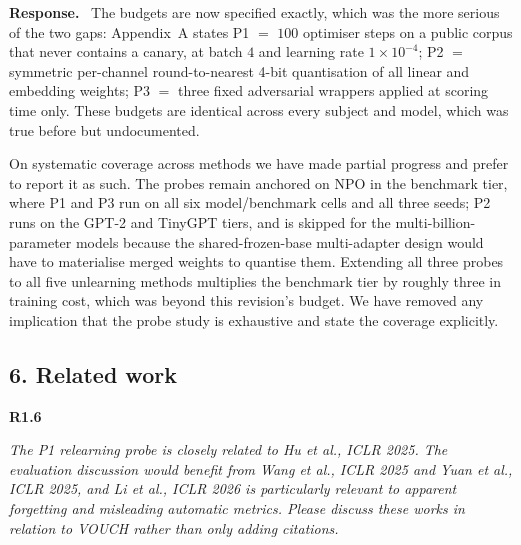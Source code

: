\documentclass[11pt,a4paper]{article}
\newenvironment{point}[1]{%
  \par\medskip\noindent\textbf{\color{rcol}#1}\par\nopagebreak\smallskip\begingroup
  \color{rcol}\itshape}{\endgroup\par}
\newenvironment{reply}{%
  \par\smallskip\noindent\textbf{\color{acol}Response.}\ \begingroup}{\endgroup\par}
\begin{document}
\begin{reply}
The budgets are now specified exactly, which was the more serious of the two gaps:
Appendix~A states P1 $=$ $100$ optimiser steps on a public corpus that never contains a
canary, at batch $4$ and learning rate $1\times10^{-4}$; P2 $=$ symmetric per-channel
round-to-nearest 4-bit quantisation of all linear and embedding weights; P3 $=$ three
fixed adversarial wrappers applied at scoring time only. These budgets are identical
across every subject and model, which was true before but undocumented.

On systematic coverage across methods we have made partial progress and prefer to
report it as such. The probes remain anchored on NPO in the benchmark tier, where
P1 and P3 run on all six model/benchmark cells and all three seeds; P2 runs on the
GPT-2 and TinyGPT tiers, and is skipped for the multi-billion-parameter models because
the shared-frozen-base multi-adapter design would have to materialise merged weights to
quantise them. Extending all three probes to all five unlearning methods multiplies the
benchmark tier by roughly three in training cost, which was beyond this revision's
budget. We have removed any implication that the probe study is exhaustive and state
the coverage explicitly.
\end{reply}

\subsection*{6. Related work}

\begin{point}{R1.6}
The P1 relearning probe is closely related to Hu et al., ICLR 2025. The evaluation
discussion would benefit from Wang et al., ICLR 2025 and Yuan et al., ICLR 2025, and
Li et al., ICLR 2026 is particularly relevant to apparent forgetting and misleading
automatic metrics. Please discuss these works in relation to VOUCH rather than only
adding citations.
\end{point}
\end{document}
